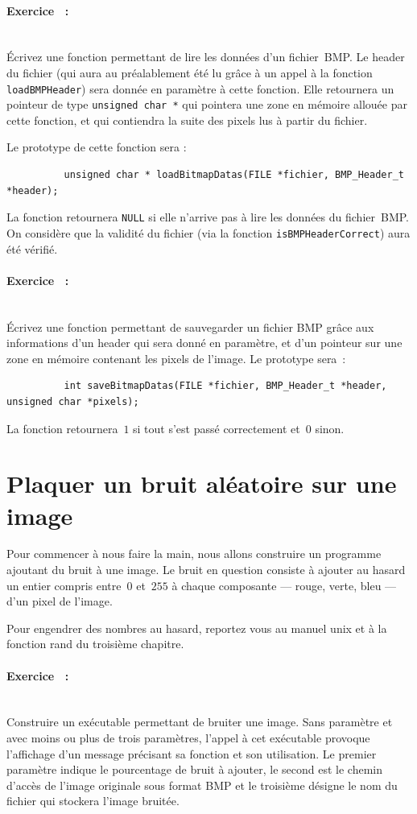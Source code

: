 \documentclass[a4paper]{article}
\newcounter{exerc}
\newcommand{\exercice}{\stepcounter{exerc}
  \setcounter{quest}{0}
  \paragraph{\large \bf Exercice \theexerc~:}}
\newcounter{quest}
\begin{document}
\exercice\ \\
\'Ecrivez une fonction permettant de lire les donn\'ees d'un fichier~BMP\@.
Le header du fichier (qui aura au pr\'ealablement \'et\'e lu gr\^ace \`a un
appel \`a la fonction \verb|loadBMPHeader|) sera donn\'ee en param\`etre
\`a cette fonction. Elle retournera un pointeur de type %
\verb|unsigned char *| qui pointera une zone en m\'emoire allou\'ee
par cette fonction, et qui contiendra la suite des pixels lus \`a
partir du fichier.

Le prototype de cette fonction sera :
\begin{verbatim}
          unsigned char * loadBitmapDatas(FILE *fichier, BMP_Header_t *header);
\end{verbatim}

La fonction retournera \verb|NULL| si elle n'arrive pas \`a lire les
donn\'ees du fichier~BMP\@. On consid\`ere que la validit\'e du
fichier (via la fonction \verb|isBMPHeaderCorrect|) aura \'et\'e
v\'erifi\'e.

\exercice\ \\
\'Ecrivez une fonction permettant de sauvegarder un fichier BMP gr\^ace
aux informations d'un header qui sera donn\'e en param\`etre, et d'un
pointeur sur une zone en m\'emoire contenant les pixels de l'image. Le
prototype sera~:
\begin{verbatim}
          int saveBitmapDatas(FILE *fichier, BMP_Header_t *header, unsigned char *pixels);
\end{verbatim}

La fonction retournera~$1$ si tout s'est pass\'e correctement et~$0$
sinon.
\section{Plaquer un bruit al\'eatoire sur une image}
\label{sec:bruiteur}
Pour commencer \`a nous faire la main, nous allons construire un
programme ajoutant du bruit \`a une image.  Le bruit en question
consiste \`a ajouter au hasard un entier compris entre~$0$ et~$255$
\`a chaque composante --- rouge, verte, bleu --- d'un pixel de
l'image.

Pour engendrer des nombres au hasard, reportez vous au manuel unix et
\`a la fonction rand du troisi\`eme chapitre.

\exercice\ \\

Construire un ex\'ecutable permettant de bruiter une image. Sans
param\`etre et avec moins ou plus de trois param\`etres, l'appel \`a
cet ex\'ecutable provoque l'affichage d'un message pr\'ecisant sa
fonction et son utilisation. Le premier param\`etre indique le
pourcentage de bruit \`a ajouter, le second est le chemin d'acc\`es de
l'image originale sous format BMP et le troisi\`eme d\'esigne le nom
du fichier qui stockera l'image bruit\'ee.
\end{document}
